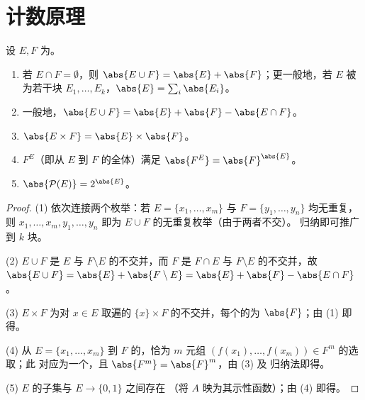 \section{计数原理}

\begin{proposition}[加法与乘法法则]\label{prop:b1:counting:rules}
设 $E, F$ 为。
\begin{enumerate}
  \item 若 $E \cap F = \emptyset$，则 $\abs{E \cup F} = \abs{E} +
        \abs{F}$；更一般地，若 $E$ 被为若干块
        $E_1, \dots, E_k$，$\abs{E} = \sum_i \abs{E_i}$。
  \item 一般地，$\abs{E \cup F} = \abs{E} + \abs{F} - \abs{E \cap
        F}$。
  \item $\abs{E \times F} = \abs{E} \times \abs{F}$。
  \item {} $F^E$（即从 $E$ 到 $F$ 的全体）满足
        $\abs{F^E} = \abs{F}^{\abs{E}}$。
  \item $\abs{\mathcal{P}(E)} = 2^{\abs{E}}$。
\end{enumerate}
\end{proposition}

\begin{proof}
(1) 依次连接两个枚举：若 $E = \{x_1, \dots, x_m\}$ 与 $F =
\{y_1, \dots, y_n\}$ 均无重复，则 $x_1, \dots, x_m, y_1,
\dots, y_n$ 即为 $E \cup F$ 的无重复枚举（由于两者不交）。
归纳即可推广到 $k$ 块。

(2) $E \cup F$ 是 $E$ 与 $F \setminus E$ 的不交并，而
$F$ 是 $F \cap E$ 与 $F \setminus E$ 的不交并，故
$\abs{E \cup F} = \abs{E} + \abs{F \setminus E} = \abs{E} + \abs{F} -
\abs{E \cap F}$。

(3) $E \times F$ 为对 $x \in E$ 取遍的
$\{x\} \times F$ 的不交并，每个的为 $\abs{F}$；由 (1) 即得。

(4) 从 $E = \{x_1, \dots, x_m\}$ 到 $F$ 的，恰为
$m$ 元组 $(f(x_1), \dots, f(x_m)) \in F^m$ 的选取；此
对应为一个，且 $\abs{F^m} = \abs{F}^m$，由 (3) 及
归纳法即得。

(5) $E$ 的子集与 $E \to \{0, 1\}$ 之间存在
（将 $A$ 映为其示性函数）；由 (4) 即得。
\end{proof}

